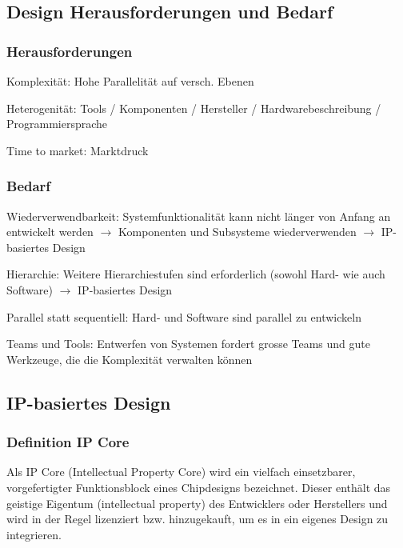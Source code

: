 \begin{multicols}{2} 
    \subsection{Design Herausforderungen und Bedarf}
    \subsubsection{Herausforderungen}
    \begin{compactitem}
        \item Komplexität: Hohe Parallelität auf versch. Ebenen
        \item Heterogenität: Tools / Komponenten / Hersteller / Hardwarebeschreibung / Programmiersprache
        \item Time to market: Marktdruck
    \end{compactitem}
    \subsubsection{Bedarf}
    \begin{compactitem}
        \item Wiederverwendbarkeit: Systemfunktionalität kann nicht länger von Anfang an entwickelt werden $\rightarrow$ Komponenten und Subsysteme wiederverwenden $\rightarrow$ IP-basiertes Design 
        \item Hierarchie: Weitere Hierarchiestufen sind erforderlich (sowohl Hard- wie auch Software) $\rightarrow$ IP-basiertes Design
        \item Parallel statt sequentiell: Hard- und Software sind parallel zu entwickeln
        \item Teams und Tools: Entwerfen von Systemen fordert grosse Teams und gute Werkzeuge, die die Komplexität verwalten können
    \end{compactitem}
    \subsection{IP-basiertes Design}
    \subsubsection{Definition IP Core}
    Als IP Core (Intellectual Property Core) wird ein vielfach einsetzbarer, vorgefertigter Funktionsblock eines Chipdesigns bezeichnet. Dieser enthält das geistige Eigentum (intellectual property) des Entwicklers oder Herstellers und wird in der Regel lizenziert bzw. hinzugekauft, um es in ein eigenes Design zu integrieren.

\end{multicols}
